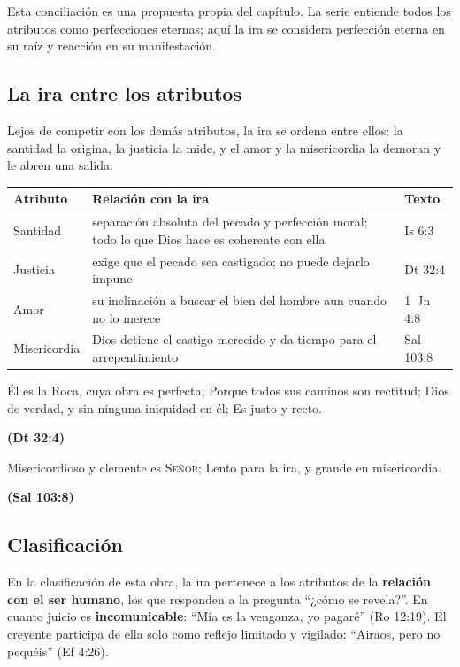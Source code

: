 \documentclass[11pt,letterpaper]{article}
\newcommand{\SENOR}{\textsc{Señor}}
\newcommand{\fuente}[1]{\par\hfill{\upshape\bfseries\small\textcolor{azul}{#1}}}
\newcommand{\destacar}[1]{\textbf{\textcolor{azul}{#1}}}
\begin{document}
\begin{nota}[Precisión]
Esta conciliación es una propuesta propia del capítulo. La serie entiende todos los atributos como perfecciones eternas; aquí la ira se considera perfección eterna en su raíz y reacción en su manifestación.
\end{nota}

\subsection{La ira entre los atributos}
Lejos de competir con los demás atributos, la ira se ordena entre ellos: la santidad la origina, la justicia la mide, y el amor y la misericordia la demoran y le abren una salida.

\begin{center}\small\renewcommand{\arraystretch}{1.25}
\begin{tabular}{@{}L{2.8cm}L{8.2cm}L{3.4cm}@{}}
\toprule
\textbf{Atributo} & \textbf{Relación con la ira} & \textbf{Texto} \\ \midrule
Santidad & separación absoluta del pecado y perfección moral; todo lo que Dios hace es coherente con ella & Is 6:3 \\
Justicia & exige que el pecado sea castigado; no puede dejarlo impune & Dt 32:4 \\
Amor & su inclinación a buscar el bien del hombre aun cuando no lo merece & 1~Jn 4:8 \\
Misericordia & Dios detiene el castigo merecido y da tiempo para el arrepentimiento & Sal 103:8 \\
\bottomrule
\end{tabular}\end{center}

\begin{cita}Él es la Roca, cuya obra es perfecta, Porque todos sus caminos son rectitud; Dios de verdad, y sin ninguna iniquidad en él; Es justo y recto.\fuente{(Dt 32:4)}\end{cita}

\begin{cita}Misericordioso y clemente es \SENOR; Lento para la ira, y grande en misericordia.\fuente{(Sal 103:8)}\end{cita}

\subsection{Clasificación}
En la clasificación de esta obra, la ira pertenece a los atributos de la \destacar{relación con el ser humano}, los que responden a la pregunta ``¿cómo se revela?''. En cuanto juicio es \destacar{incomunicable}: ``Mía es la venganza, yo pagaré'' (Ro 12:19). El creyente participa de ella solo como reflejo limitado y vigilado: ``Airaos, pero no pequéis'' (Ef 4:26).
\end{document}
